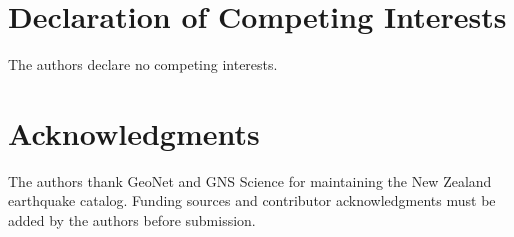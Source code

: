 \documentclass[12pt]{article}
\begin{document}
\section*{Declaration of Competing Interests}

The authors declare no competing interests.

\section*{Acknowledgments}

The authors thank GeoNet and GNS Science for maintaining the New Zealand
earthquake catalog. Funding sources and contributor acknowledgments must be
added by the authors before submission.



\end{document}
